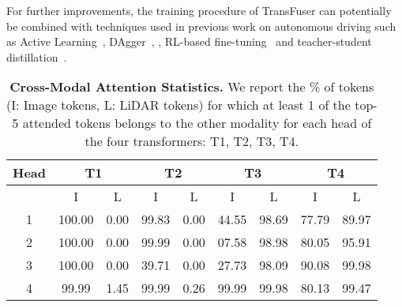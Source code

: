  For further improvements, the training procedure of TransFuser can potentially be combined with techniques used in previous work on autonomous driving such as Active Learning~\cite{Chitta2018ARXIV,Chitta2019ARXIV,Haussmann2020IV}, DAgger~\cite{Ross2011AISTATS,Prakash2020CVPR}, , RL-based fine-tuning~\cite{Ohn-Bar2020CVPR} and teacher-student distillation~\cite{Chen2019CORL, Chen2021ICCVb, Zhao2020CORL, Chen2022CVPR}.

\begin{table}[t]
\small
    \centering
    \setlength{\tabcolsep}{3pt}
    \begin{tabular}{c | c c | c c | c c | c c}
        \textbf{Head} & \multicolumn{2}{c|}{\textbf{T1}} & \multicolumn{2}{c|}{\textbf{T2}} & \multicolumn{2}{c|}{\textbf{T3}} & \multicolumn{2}{c}{\textbf{T4}} \\
        \hline
        & I & L & I & L & I & L & I & L \\
        \hline
        1 & 100.00 & 0.00 & 99.83 & 0.00 & 44.55 & 98.69 & 77.79 & 89.97 \\
        2 & 100.00 & 0.00 & 99.99 & 0.00 & 07.58 & 98.98 & 80.05 & 95.91 \\
        3 & 100.00 & 0.00 & 39.71 & 0.00 & 27.73 & 98.09 & 90.08 & 99.98 \\
        4 & 99.99 & 1.45 & 99.99 & 0.26 & 99.99 & 99.98 & 80.13 & 99.47 \\
        \hline
    \end{tabular}
    \caption{\textbf{Cross-Modal Attention Statistics.} We report the \% of tokens (I: Image tokens, L: LiDAR tokens) for which at least 1 of the top-5 attended tokens belongs to the other modality for each head of the four transformers: T1, T2, T3, T4.}
    \label{tab:attention_statistics}
\end{table}


